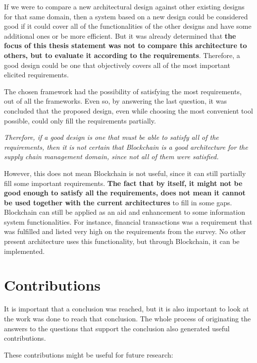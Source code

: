 If we were to compare a new architectural design against other existing designs for that same domain, then a system based on a new design could be considered good if it could cover all of the functionalities of the other designs and have some additional ones or be more efficient. But it was already determined that \textbf{the focus of this thesis statement was not to compare this architecture to others, but to evaluate it according to the requirements}. Therefore, a good design could be one that objectively covers all of the most important elicited requirements.

\par The chosen framework had the possibility of satisfying the most requirements, out of all the frameworks. Even so, by answering the last question, it was concluded that the proposed design, even while choosing the most convenient tool possible, could only fill the requirements partially.

\emph{Therefore, if a good design is one that must be able to satisfy all of the requirements, then it is not certain that Blockchain is a good architecture for the supply chain management domain, since not all of them were satisfied.}

However, this does not mean Blockchain is not useful, since it can still partially fill some important requirements. \textbf{The fact that by itself, it might not be good enough to satisfy all the requirements, does not mean it cannot be used together with the current architectures} to fill in some gaps. Blockchain can still be applied as an aid and enhancement to some information system functionalities. For instance, financial transactions was a requirement that was fulfilled and listed very high on the requirements from the survey. No other present architecture uses this functionality, but through Blockchain, it can be implemented.

\section{Contributions}
It is important that a conclusion was reached, but it is also important to look at the work was done to reach that conclusion. The whole process of originating the answers to the questions that support the conclusion also generated useful contributions. 

These contributions might be useful for future research:

